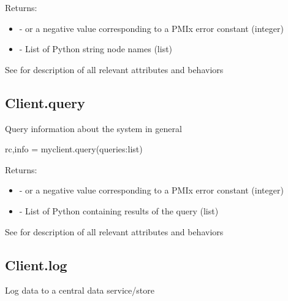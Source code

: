 Returns:

\begin{itemize}
    \item {} -  or a negative value corresponding to a PMIx error constant (integer)
    \item {} - List of Python string node names (list)
\end{itemize}


See  for description of all relevant attributes and behaviors


\subsection{Client.query}

\summary

Query information about the system in general

\format

\pyspecificstart
\begin{codepar}
rc,info = myclient.query(queries:list)
\end{codepar}
\pyspecificend

\begin{arglist}
\end{arglist}

Returns:

\begin{itemize}
    \item {} -  or a negative value corresponding to a PMIx error constant (integer)
    \item {} - List of Python  containing results of the query (list)
\end{itemize}


See  for description of all relevant attributes and behaviors


\subsection{Client.log}

\summary

Log data to a central data service/store

